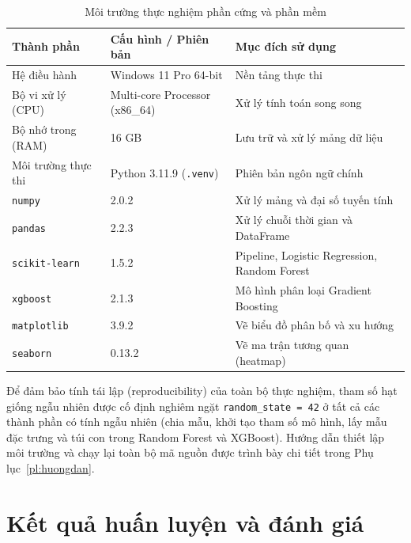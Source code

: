 \documentclass[12pt,a4paper,oneside]{report}
\begin{document}
\begin{table}[H]
  \centering
  \caption{Môi trường thực nghiệm phần cứng và phần mềm}
  \label{tab:moitruong}
  \begin{tabularx}{\textwidth}{p{3.5cm} p{4.2cm} X}
    \toprule
    \textbf{Thành phần} & \textbf{Cấu hình / Phiên bản} & \textbf{Mục đích sử dụng} \\
    \midrule
    Hệ điều hành & Windows 11 Pro 64-bit & Nền tảng thực thi \\
    Bộ vi xử lý (CPU) & Multi-core Processor (x86\_64) & Xử lý tính toán song song \\
    Bộ nhớ trong (RAM) & 16 GB & Lưu trữ và xử lý mảng dữ liệu \\
    Môi trường thực thi & Python 3.11.9 (\texttt{.venv}) & Phiên bản ngôn ngữ chính \\
    \texttt{numpy} & 2.0.2 & Xử lý mảng và đại số tuyến tính \\
    \texttt{pandas} & 2.2.3 & Xử lý chuỗi thời gian và DataFrame \\
    \texttt{scikit-learn} & 1.5.2 & Pipeline, Logistic Regression, Random Forest \\
    \texttt{xgboost} & 2.1.3 & Mô hình phân loại Gradient Boosting \\
    \texttt{matplotlib} & 3.9.2 & Vẽ biểu đồ phân bố và xu hướng \\
    \texttt{seaborn} & 0.13.2 & Vẽ ma trận tương quan (heatmap) \\
    \bottomrule
  \end{tabularx}
\end{table}

Để đảm bảo tính tái lập (reproducibility) của toàn bộ thực nghiệm, tham số hạt giống
ngẫu nhiên được cố định nghiêm ngặt \texttt{random\_state = 42} ở tất cả các thành phần
có tính ngẫu nhiên (chia mẫu, khởi tạo tham số mô hình, lấy mẫu đặc trưng và túi con
trong Random Forest và XGBoost). Hướng dẫn thiết lập môi trường và chạy lại toàn bộ mã
nguồn được trình bày chi tiết trong Phụ lục~\ref{pl:huongdan}.

\section{Kết quả huấn luyện và đánh giá}
\end{document}
